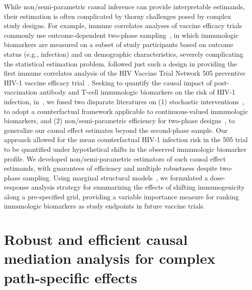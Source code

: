While non/semi-parametric causal inference can provide interpretable estimands,
their estimation is often complicated by thorny challenges posed by complex
study designs. For example, immune correlates analyses of vaccine efficacy
trials commonly use outcome-dependent two-phase
sampling~\citep{haynes2012immune}, in which immunologic biomarkers are measured
on a subset of study participants based on outcome status (e.g., infection) and
on demographic characteristics, severely complicating the statistical estimation
problem.
\citet{janes2017higher} followed just such a design in providing the first
immune correlates analysis of the HIV Vaccine Trial Network 505 preventive HIV-1
vaccine efficacy trial~\citep{hammer2013efficacy}. Seeking to quantify the
causal impact of post-vaccination antibody and T-cell immunologic biomarkers on
the risk of HIV-1 infection, in~\citet{hejazi2020efficient}, we fused two
disparate literatures on (1) stochastic
interventions~\citep{stock1989nonparametric,diaz2012population}, to adopt
a counterfactual framework applicable to continuous-valued immunologic
biomarkers, and (2) non/semi-parametric efficiency for two-phase
designs~\citep{breslow2003large,rose2011targeted2sd}, to generalize our causal
effect estimates beyond the second-phase sample.
Our approach allowed for the mean counterfactual HIV-1 infection risk in the 505
trial to be quantified under hypothetical shifts in the observed immunologic
biomarker profile. We developed non/semi-parametric estimators of such causal
effect estimands, with guarantees of efficiency and multiple robustness despite
two-phase sampling. Using marginal structural
models~\citep{neugebauer2007nonparametric}, we formulated a dose-response
analysis strategy for summarizing the effects of shifting immunogenicity along
a pre-specified grid, providing a variable importance measure for ranking
immunologic biomarkers as study endpoints in future vaccine trials.

\section{Robust and efficient causal mediation analysis for complex
  path-specific effects}

